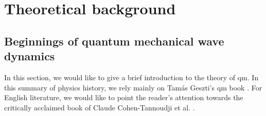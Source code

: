 \section{Theoretical background}
\label{sec:theory}

\subsection{Beginnings of quantum mechanical wave dynamics}

In this section, we would like to give a brief introduction to the theory of \acrshort{qm}. In this summary of physics history, we rely mainly on Tamás Geszti's \acrshort{qm} book \cite{geszti2007}.
For English literature, we would like to point the reader's attention towards the critically acclaimed book of Claude Cohen-Tannoudji et al. \cite{tannoudjiVol1}.
%
